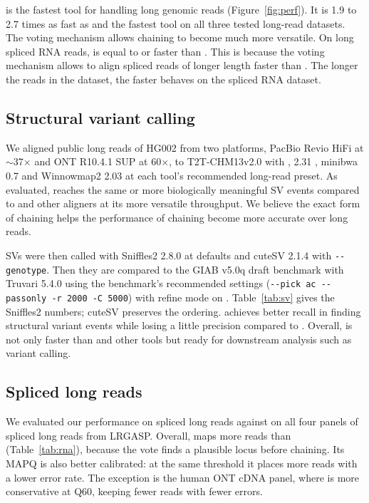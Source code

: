 \flash{} is the fastest tool for handling long genomic reads (Figure~\ref{fig:perf}). It is 1.9 to 2.7 times as fast as \mmtwo{} and the fastest tool on all three tested long-read datasets. The voting mechanism allows chaining to become much more versatile. On long spliced RNA reads, \flash{} is equal to or faster than \mmtwo{}. This is because the voting mechanism allows \flash{} to align spliced reads of longer length faster than \mmtwo{}. The longer the reads in the dataset, the faster \flash{} behaves on the spliced RNA dataset.


\subsection{Structural variant calling}
\label{sec:res-sv}


We aligned public long reads of HG002 from two platforms, PacBio Revio HiFi at $\sim$37$\times$ and ONT R10.4.1 SUP at 60$\times$, to T2T-CHM13v2.0 \citep{nurk2022chm13} with \flash{}, \mmtwo{} 2.31 \citep{li2018minimap2}, minibwa 0.7 \citep{li2026minibwa} and Winnowmap2 2.03 \citep{jain2022winnowmap2} at each tool's recommended long-read preset. As evaluated, \flash{} reaches the same or more biologically meaningful SV events compared to \mmtwo{} and other aligners at its more versatile throughput. We believe the exact form of chaining helps the performance of chaining become more accurate over long reads.

SVs were then called with Sniffles2 2.8.0 \citep{smolka2024sniffles2} at defaults and cuteSV 2.1.4 \citep{jiang2020cutesv} with \texttt{\mbox{-{}-genotype}}. Then they are compared to the GIAB v5.0q draft benchmark \citep{zook2020giab,giab2025v50q} with Truvari 5.4.0 \citep{english2022truvari} using the benchmark's recommended settings (\texttt{\mbox{-{}-pick}~ac \mbox{-{}-passonly} \mbox{-r~2000} \mbox{-C~5000}}) with refine mode on \citep{english2024tandem}. Table~\ref{tab:sv} gives the Sniffles2 numbers; cuteSV preserves the ordering. \flash{} achieves better recall in finding structural variant events while losing a little precision compared to \mmtwo{}. Overall, \flash{} is not only faster than \mmtwo{} and other tools but ready for downstream analysis such as variant calling.


\subsection{Spliced long reads}
\label{sec:res-rna}

We evaluated our performance on spliced long reads against \mmtwo{} on all four panels of spliced long reads from LRGASP. Overall, \flash{} maps more reads than \mmtwo{} (Table~\ref{tab:rna}), because the vote finds a plausible locus before chaining. Its MAPQ is also better calibrated: at the same threshold it places more reads with a lower error rate. The exception is the human ONT cDNA panel, where \flash{} is more conservative at Q60, keeping fewer reads with fewer errors.



